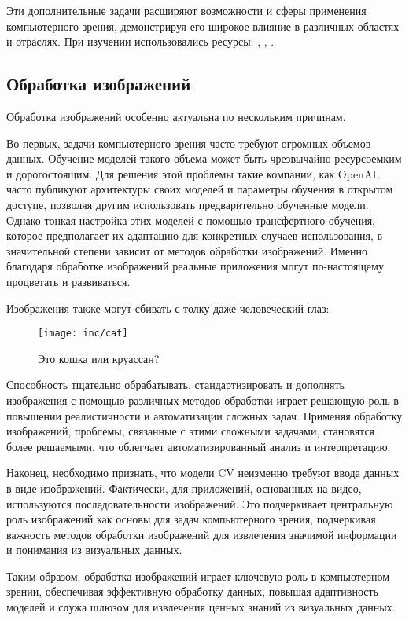 Эти дополнительные задачи расширяют возможности и сферы применения компьютерного зрения, демонстрируя его широкое влияние в различных областях и отраслях. При изучении использовались ресурсы: \cite{31}, \cite{36}, \cite{32}.

\subsection{Обработка изображений}

Обработка изображений особенно актуальна по нескольким причинам. 

Во-первых, задачи компьютерного зрения часто требуют огромных объемов данных. Обучение моделей такого объема может быть чрезвычайно ресурсоемким и дорогостоящим. Для решения этой проблемы такие компании, как OpenAI, часто публикуют архитектуры своих моделей и параметры обучения в открытом доступе, позволяя другим использовать предварительно обученные модели. Однако тонкая настройка этих моделей с помощью трансфертного обучения, которое предполагает их адаптацию для конкретных случаев использования, в значительной степени зависит от методов обработки изображений. Именно благодаря обработке изображений реальные приложения могут по-настоящему процветать и развиваться.

Изображения также могут сбивать с толку даже человеческий глаз: 
\begin{figure}
  \texttt{[image: inc/cat]}
  \caption{Это кошка или круассан?}
  \label{fig:fig01}
\end{figure}


Способность тщательно обрабатывать, стандартизировать и дополнять изображения с помощью различных методов обработки играет решающую роль в повышении реалистичности и автоматизации сложных задач. Применяя обработку изображений, проблемы, связанные с этими сложными задачами, становятся более решаемыми, что облегчает автоматизированный анализ и интерпретацию.

Наконец, необходимо признать, что модели CV неизменно требуют ввода данных в виде изображений. Фактически, для приложений, основанных на видео, используются последовательности изображений. Это подчеркивает центральную роль изображений как основы для задач компьютерного зрения, подчеркивая важность методов обработки изображений для извлечения значимой информации и понимания из визуальных данных.

Таким образом, обработка изображений играет ключевую роль в компьютерном зрении, обеспечивая эффективную обработку данных, повышая адаптивность моделей и служа шлюзом для извлечения ценных знаний из визуальных данных.

